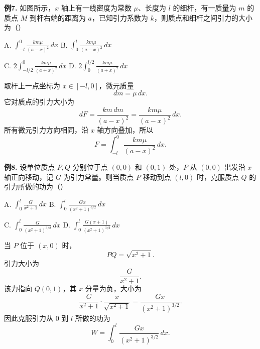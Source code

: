 \begin{problemblock}
\textbf{例7.} 如图所示，\(x\) 轴上有一线密度为常数 \(\mu\)、长度为 \(l\) 的细杆，有一质量为 \(m\) 的质点 \(M\) 到杆右端的距离为 \(a\)，已知引力系数为 \(k\)，则质点和细杆之间引力的大小为（\quad）

A. \(\displaystyle \int_{-l}^{0}\frac{km\mu}{(a-x)^2}\,dx\)
\quad
B. \(\displaystyle \int_0^l\frac{km\mu}{(a-x)^2}\,dx\)

C. \(\displaystyle 2\int_{-l/2}^{0}\frac{km\mu}{(a+x)^2}\,dx\)
\quad
D. \(\displaystyle 2\int_0^{l/2}\frac{km\mu}{(a+x)^2}\,dx\)
\end{problemblock}
\begin{solutionblock}
取杆上一点坐标为 \(x\in[-l,0]\)，微元质量
\[
dm=\mu\,dx.
\]
它对质点的引力大小为
\[
dF=\frac{k m\,dm}{(a-x)^2}
=\frac{km\mu}{(a-x)^2}\,dx.
\]
所有微元引力方向相同，沿 \(x\) 轴方向叠加，所以
\[
F=\int_{-l}^{0}\frac{km\mu}{(a-x)^2}\,dx.
\]
\end{solutionblock}

\begin{problemblock}
\textbf{例8.} 设单位质点 \(P,Q\) 分别位于点 \((0,0)\) 和 \((0,1)\) 处，\(P\) 从 \((0,0)\) 出发沿 \(x\) 轴正向移动，记 \(G\) 为引力常量。则当质点 \(P\) 移动到点 \((l,0)\) 时，克服质点 \(Q\) 的引力所做的功为（\quad）

A. \(\displaystyle \int_0^l\frac{G}{x^2+1}\,dx\)
\quad
B. \(\displaystyle \int_0^l\frac{Gx}{(x^2+1)^{3/2}}\,dx\)

C. \(\displaystyle \int_0^l\frac{G}{(x^2+1)^{3/2}}\,dx\)
\quad
D. \(\displaystyle \int_0^l\frac{G(x+1)}{(x^2+1)^{3/2}}\,dx\)
\end{problemblock}
\begin{solutionblock}
当 \(P\) 位于 \((x,0)\) 时，
\[
PQ=\sqrt{x^2+1}.
\]
引力大小为
\[
\frac{G}{x^2+1}.
\]
该力指向 \(Q(0,1)\)，其 \(x\) 分量为负，大小为
\[
\frac{G}{x^2+1}\cdot\frac{x}{\sqrt{x^2+1}}
=\frac{Gx}{(x^2+1)^{3/2}}.
\]
因此克服引力从 \(0\) 到 \(l\) 所做的功为
\[
W=\int_0^l\frac{Gx}{(x^2+1)^{3/2}}\,dx.
\]
\end{solutionblock}

